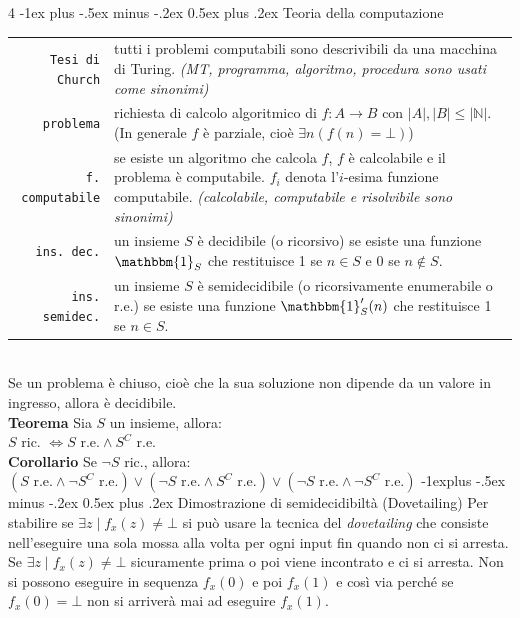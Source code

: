 \documentclass[10pt,landscape]{article}
\makeatletter
\renewcommand{\section}{\@startsection{section}{1}{0mm}%
                                {-1ex plus -.5ex minus -.2ex}%
                                {0.5ex plus .2ex}%
                                {\normalfont\Large\bfseries}}
\renewcommand{\subsection}{\@startsection{subsection}{2}{0mm}%
                                {-1explus -.5ex minus -.2ex}%
                                {0.5ex plus .2ex}%
                                {\normalfont\large\bfseries}}
\makeatother
\begin{document}
\begin{multicols*}{4}
        \section{Teoria della computazione}
        \begin{tabular}{@{}r p{6.5cm}@{}}
                \verb|Tesi di Church| & tutti i problemi computabili sono descrivibili da una macchina di Turing. \textit{(MT, programma, algoritmo, procedura sono usati come sinonimi)}                                                     \\
                \verb|problema|       & richiesta di calcolo algoritmico di $f:A\rightarrow B$ con $|A|,|B| \leq |\mathbb{N}|$. (In generale $f$ è parziale, cioè $\exists n(f(n)=\bot)$)                                                     \\
                \verb|f. computabile| & se esiste un algoritmo che calcola $f$, $f$ è calcolabile e il problema è computabile. $f_i$ denota l'$i$-esima funzione computabile. \textit{(calcolabile, computabile e risolvibile sono sinonimi)} \\
                \verb|ins. dec.|      & un insieme $S$ è decidibile (o ricorsivo) se esiste una funzione $\mathbbm{1}_S$ che restituisce 1 se $n \in S$ e 0 se $n \notin S$.                                                                  \\
                \verb|ins. semidec.|  & un insieme $S$ è semidecidibile (o ricorsivamente enumerabile o r.e.) se esiste una funzione $\mathbbm{1}'_S(n)$ che restituisce 1 se $n \in S$.                                                      \\
        \end{tabular} \\[3pt]
        Se un problema è chiuso, cioè che la sua soluzione non dipende da un valore in ingresso, allora è decidibile. \\[3pt]
        \textbf{Teorema} Sia $S$ un insieme, allora:\\ $S \text{ ric. } \iff S \text{ r.e.} \land S^C \text{ r.e.}$ \\ [3pt]
        \textbf{Corollario} Se $\lnot S$ ric., allora: \\
        $(S \text{ r.e.} \land \lnot S^C \text{ r.e.}) \lor (\lnot S \text{ r.e.} \land S^C \text{ r.e.}) \lor (\lnot S \text{ r.e.} \land \lnot S^C \text{ r.e.})$
        \subsection{Dimostrazione di semidecidibiltà (Dovetailing)}
        Per stabilire se $\exists z \mid f_x(z) \neq \bot$ si può usare la tecnica del \textit{dovetailing} che consiste nell'eseguire una sola mossa alla volta per ogni input fin quando non ci si arresta. Se $\exists z \mid f_x(z) \neq \bot$ sicuramente prima o poi viene incontrato e ci si arresta. Non si possono eseguire in sequenza $f_x(0)$ e poi $f_x(1)$ e così via perché se $f_x(0) = \bot$ non si arriverà mai ad eseguire $f_x(1)$.\\ [3pt]
        \columnbreak

\end{multicols*}
\end{document}
